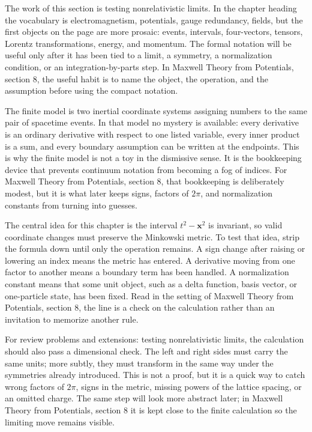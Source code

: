 The work of this section is testing nonrelativistic limits.  In the chapter heading the vocabulary is electromagnetism, potentials, gauge redundancy, fields, but the first objects on the page are more prosaic: events, intervals, four-vectors, tensors, Lorentz transformations, energy, and momentum.  The formal notation will be useful only after it has been tied to a limit, a symmetry, a normalization condition, or an integration-by-parts step.  In Maxwell Theory from Potentials, section 8, the useful habit is to name the object, the operation, and the assumption before using the compact notation.

The finite model is two inertial coordinate systems assigning numbers to the same pair of spacetime events.  In that model no mystery is available: every derivative is an ordinary derivative with respect to one listed variable, every inner product is a sum, and every boundary assumption can be written at the endpoints.  This is why the finite model is not a toy in the dismissive sense.  It is the bookkeeping device that prevents continuum notation from becoming a fog of indices.  For Maxwell Theory from Potentials, section 8, that bookkeeping is deliberately modest, but it is what later keeps signs, factors of \(2\pi\), and normalization constants from turning into guesses.

The central idea for this chapter is the interval \(t^2-\bm x^2\) is invariant, so valid coordinate changes must preserve the Minkowski metric.  To test that idea, strip the formula down until only the operation remains.  A sign change after raising or lowering an index means the metric has entered.  A derivative moving from one factor to another means a boundary term has been handled.  A normalization constant means that some unit object, such as a delta function, basis vector, or one-particle state, has been fixed.  Read in the setting of Maxwell Theory from Potentials, section 8, the line is a check on the calculation rather than an invitation to memorize another rule.

For review problems and extensions: testing nonrelativistic limits, the calculation should also pass a dimensional check.  The left and right sides must carry the same units; more subtly, they must transform in the same way under the symmetries already introduced.  This is not a proof, but it is a quick way to catch wrong factors of \(2\pi\), signs in the metric, missing powers of the lattice spacing, or an omitted charge.  The same step will look more abstract later; in Maxwell Theory from Potentials, section 8 it is kept close to the finite calculation so the limiting move remains visible.


